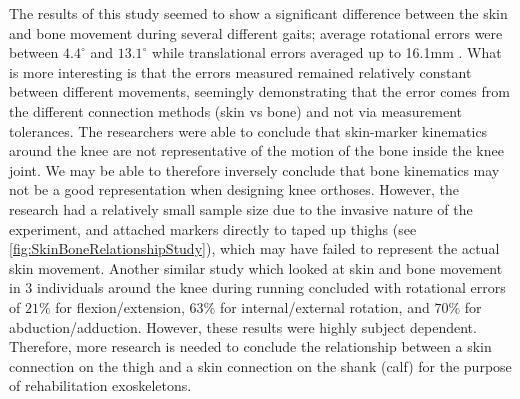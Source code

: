 The results of this study seemed to show a significant difference between the skin and bone movement during several different gaits; average rotational errors were between \(4.4^\circ\) and \(13.1^\circ\) while translational errors averaged up to 16.1mm \cite{SkinMovementKneeKin}. What is more interesting is that the errors measured remained relatively constant between different movements, seemingly demonstrating that the error comes from the different connection methods (skin vs bone) and not via measurement tolerances. The researchers were able to conclude that skin-marker kinematics around the knee are not representative of the motion of the bone inside the knee joint. We may be able to therefore inversely conclude that bone kinematics may not be a good representation when designing knee orthoses. However, the research had a relatively small sample size due to the invasive nature of the experiment, and attached markers directly to taped up thighs (see \autoref{fig:SkinBoneRelationshipStudy}), which may have failed to represent the actual skin movement. Another similar study which looked at skin and bone movement in 3 individuals around the knee during running concluded with rotational errors of \(21\%\) for flexion/extension, \(63\%\) for internal/external rotation, and \(70\%\) for abduction/adduction. However, these results were highly subject dependent. Therefore, more research is needed to conclude the relationship between a skin connection on the thigh and a skin connection on the shank (calf) for the purpose of rehabilitation exoskeletons.



